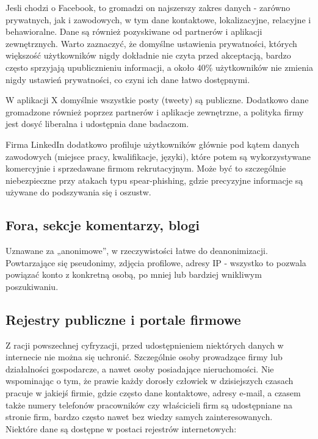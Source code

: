 Jesli chodzi o Facebook, to gromadzi on najszerszy zakres danych - zarówno prywatnych, jak i zawodowych, w tym dane kontaktowe, lokalizacyjne, relacyjne i behawioralne. Dane są również pozyskiwane od partnerów i aplikacji zewnętrznych. Warto zaznaczyć, że domyślne ustawienia prywatności, których większość użytkowników nigdy dokładnie nie czyta przed akceptacją, bardzo często sprzyjają upublicznieniu informacji, a około 40\% użytkowników nie zmienia nigdy ustawień prywatności, co czyni ich dane łatwo dostępnymi.

W aplikacji X domyślnie wszystkie posty (tweety) są publiczne. Dodatkowo dane gromadzone również poprzez partnerów i aplikacje zewnętrzne, a polityka firmy jest dosyć liberalna i udostępnia dane badaczom.

Firma LinkedIn dodatkowo profiluje użytkowników głównie pod kątem danych zawodowych (miejsce pracy, kwalifikacje, języki), które potem są wykorzystywane komercyjnie i sprzedawane firmom rekrutacyjnym. Może być to szczególnie niebezpieczne przy atakach typu spear-phishing, gdzie precyzyjne informacje są używane do podszywania się i oszustw.

\subsection{Fora, sekcje komentarzy, blogi}

Uznawane za „anonimowe”, w rzeczywistości łatwe do deanonimizacji. Powtarzające się pseudonimy, zdjęcia profilowe, adresy IP - wszystko to pozwala powiązać konto z konkretną osobą, po mniej lub bardziej wnikliwym poszukiwaniu.

\subsection{Rejestry publiczne i portale firmowe}
Z racji powszechnej cyfryzacji, przed udostępnieniem niektórych danych w internecie nie można się uchronić. Szczególnie osoby prowadzące firmy lub działalności gospodarcze, a nawet osoby posiadające nieruchomości. 
Nie wspominając o tym, że prawie każdy dorosły człowiek w dzisiejszych czasach pracuje w jakiejś firmie, gdzie często dane kontaktowe, adresy e-mail, a czasem także numery telefonów pracowników czy właścicieli firm są udostępniane na stronie firm, bardzo często nawet bez wiedzy samych zainteresowanych.\cite{zrodloDzialalnosc} \\
Niektóre dane są dostępne w postaci rejestrów internetowych:


